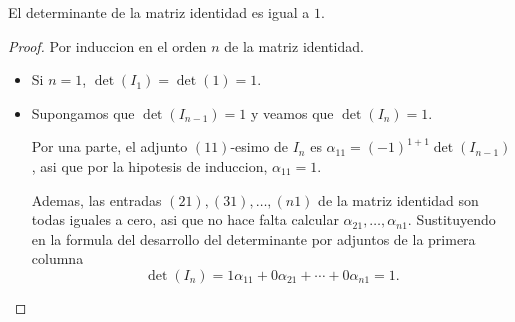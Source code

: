 \begin{lemma}
	El determinante de la matriz identidad es igual a \(1 \).
\end{lemma}
\begin{proof}
	Por induccion en el orden \(n \) de la matriz identidad.
	\begin{itemize}
		\item Si \(n = 1 \), \(\det(I_1) = \det(1) = 1\).
		\item Supongamos que \(\det(I_{n-1}) = 1\) y veamos que \(\det(I_n) = 1 \).

		      Por una parte, el adjunto \((11)\)-esimo de \(I_n \) es \(\alpha_{11} = (-1)^{1+1} \det(I_{n-1})\), asi que por la hipotesis de induccion, \(\alpha_{11} = 1\).

		      Ademas, las entradas \((21), (31), \ldots, (n1 )\) de la matriz identidad son todas iguales a cero, asi que no hace falta calcular \(\alpha_{21}, \ldots, \alpha_{n1}\). Sustituyendo en la formula del desarrollo del determinante por adjuntos de la primera columna
		      \[
			      \det(I_n) = 1\alpha_{11} + 0\alpha_{21} + \cdots + 0\alpha_{n1} = 1.
		      \]
	\end{itemize}
\end{proof}

